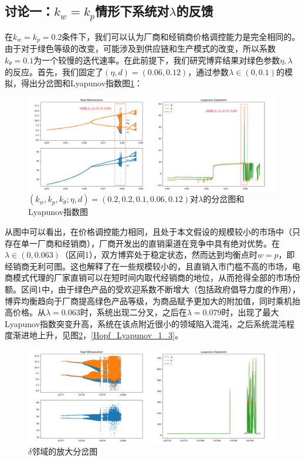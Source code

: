 \documentclass{article}
\begin{document}
\subsection{讨论一：$k_w=k_p$情形下系统对$\lambda$的反馈}\label{sec_3_1}
\par 在$k_w=k_p=0.2$条件下，我们可以认为厂商和经销商价格调控能力是完全相同的。由于对于绿色等级的改变，可能涉及到供应链和生产模式的改变，所以系数$k_\theta=0.1$为一个较慢的迭代速率。在此前提下，我们研究博弈结果对绿色参数$\eta, \lambda$的反应。首先，我们固定了$(\eta,d)=(0.06,0.12)$，通过参数$\lambda\in(0,0.1)$的模拟，得出分岔图和Lyapunov指数图\ref{Hopf_Lyapunov_1_1}：
\begin{figure}[htp]
    \centering
    \includegraphics[width=16.5cm]{Hopf_Lyapunov_1_1.png}
    \caption{$(k_w,k_p,k_\theta;\eta,d)=(0.2,0.2,0.1,0.06,0.12)$对$\lambda$的分岔图和Lyapunov指数图}
    \label{Hopf_Lyapunov_1_1}
\end{figure}
\par 从图中可以看出，在价格调控能力相同，且处于本文假设的规模较小的市场中（只存在单一厂商和经销商），厂商开发出的直销渠道在竞争中具有绝对优势。在$\lambda\in(0,0.063)$（区间1），双方博弈处于稳定状态，然而达到均衡点时$w=p$，即经销商无利可图。这也解释了在一些规模较小的，且直销入市门槛不高的市场，电商模式代理的厂家直销可以在短时间内取代经销商的地位，从而抢得全部的市场份额。区间1中，由于绿色产品的受欢迎系数不断增大（包括政府倡导力度的作用），博弈均衡趋向于厂商提高绿色产品等级，为商品赋予更加大的附加值，同时乘机抬高价格。从$\lambda=0.063$时，系统出现二分叉，之后在$\lambda=0.079$时，出现了最大Lyapunov指数突变升高，系统在该点附近很小的领域陷入混沌，之后系统混沌程度渐进地上升，见图\ref{Hopf_Lyapunov_1_2}，\ref{Hopf_Lyapunov_1_3}。
\begin{figure}[htp]
    \centering
    \includegraphics[width=16.5cm]{Hopf_Lyapunov_1_2.png}
    \caption{$\delta$邻域的放大分岔图}
    \label{Hopf_Lyapunov_1_2}
\end{figure}
\end{document}
